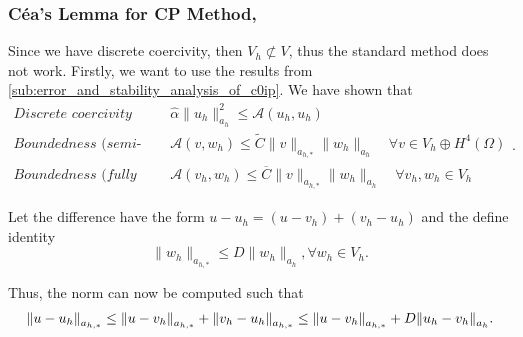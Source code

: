 \subsubsection{Céa's Lemma for CP Method, }%
\label{ssub:ceas_lemma_cp}
Since we have discrete coercivity, then $V_{h} \not \subset V$, thus the standard method does not work. Firstly, we want to use the results from \ref{sub:error_and_stability_analysis_of_c0ip}. We have shown that
\begin{equation*}
    \begin{split}
    \textit{Discrete coercivity } \quad & \hat{\alpha } \| u_{h} \|_{ a_{h} }^{ 2 }  \le  \mathcal{A} \left( u_{h}, u_{h} \right) \\
    \textit{Boundedness (semi-discrete) }\quad  & \mathcal{A} \left( v,w_{h} \right)  \le  \widetilde{C} \| v \|_{ a_{h,*} }^{  }  \| w_{h} \|_{ a_{h} }^{  } \quad \forall v \in  V_{h} \oplus H^{4}\left( \Omega  \right) \\
    \textit{Boundedness (fully discrete) }\quad  & \mathcal{A} \left( v_{h},w_{h} \right)  \le  \overline{C}  \| v \|_{ a_{h,*} }^{  }  \| w_{h} \|_{ a_{h} }^{  } \quad \forall v_{h}, w_{h} \in V_{h}
    \end{split}
.\end{equation*}

Let the difference have the form $u - u_{h} = (u - v_{h} )  + (v_{h} - u_{h})$ and the define identity
$$
\| w_{h} \|_{ a_{h,*} }^{  }  \le  D \| w_{h} \|_{ a_{h} }^{  }, \forall w_{h} \in V_{h} .
$$


Thus, the norm can now be computed such that\[
\| u - u_{h} \|_{ a_{h,*} }^{  } \le \|u - v_{h}  \|_{a_{h,*}  }^{  }  + \| v_{h} - u_{h} \|_{a_{h,*}  }^{  } \\
\le \| u -v_{h} \|_{ a_{h,*} }^{  }  + D \| u_{h} - v_{h} \|_{a_{h}  }^{  }.
\]

